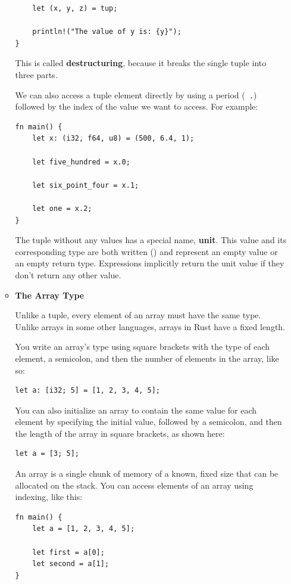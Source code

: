 \documentclass[11pt]{article}
\let\OldTexttt\texttt
\renewcommand{\texttt}[1]{\OldTexttt{\color{MidnightBlue} #1}}
\begin{document}
\begin{itemize}
\begin{itemize}
\begin{verbatim}
    let (x, y, z) = tup;

    println!("The value of y is: {y}");
}
\end{verbatim}
This is called \textbf{destructuring}, because it breaks the single tuple into three parts.

We can also access a tuple element directly by using a period (\texttt{.}) followed by the index of
the value we want to access. For example:
\begin{verbatim}
fn main() {
    let x: (i32, f64, u8) = (500, 6.4, 1);

    let five_hundred = x.0;

    let six_point_four = x.1;

    let one = x.2;
}
\end{verbatim}

The tuple without any values has a special name, \textbf{unit}. This value and its corresponding type
are both written () and represent an empty value or an empty return type. Expressions
implicitly return the unit value if they don’t return any other value.
\item \textbf{The Array Type}

Unlike a tuple, every element of an array must have the same type. Unlike arrays in some
other languages, arrays in Rust have a fixed length.

You write an array’s type using square brackets with the type of each element, a semicolon,
and then the number of elements in the array, like so:
\begin{verbatim}
let a: [i32; 5] = [1, 2, 3, 4, 5];
\end{verbatim}

You can also initialize an array to contain the same value for each element by specifying
the initial value, followed by a semicolon, and then the length of the array in square
brackets, as shown here:
\begin{verbatim}
let a = [3; 5];
\end{verbatim}

An array is a single chunk of memory of a known, fixed size that can be allocated on the
stack. You can access elements of an array using indexing, like this:
\begin{verbatim}
fn main() {
    let a = [1, 2, 3, 4, 5];

    let first = a[0];
    let second = a[1];
}
\end{verbatim}
\end{itemize}
\end{itemize}
\end{document}
